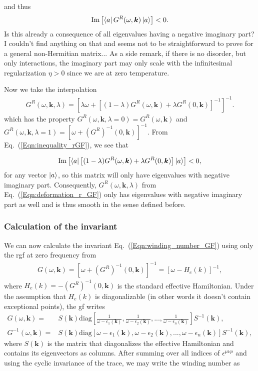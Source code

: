 \documentclass[english]{scrartcl}
\newcommand{\eq}[1]{Eq.~(\ref{#1})}
\begin{document}
and thus 
\begin{align}
\text{Im} \left[\bra{a} G^R(\omega, \bm k)  \ket{a} \right] < 0. \label{Eqn:inequality_rGF}
\end{align}
{\color{red}Is this already a consequence of all eigenvalues having a negative imaginary part? I couldn't find anything on that and seems not to be straightforward to prove for a general non-Hermitian matrix...} As a side remark, if there is no disorder, but only interactions, the imaginary part may only scale with the infinitesimal regularization $\eta >0$ since we are at zero temperature.

Now we take the interpolation 
\begin{align}
G^R(\omega, \bm k,\lambda) = \left [\lambda \omega + \left [(1- \lambda)  G^R(\omega, \bm k) + \lambda G^R(0, \bm k) \right]^{-1} \right]^{-1}.  \label{Eqn:deformation_r_GF}
\end{align}
which has the property $G^R(\omega, \bm k,\lambda = 0) =  G^R(\omega, \bm k)$ and $G^R(\omega, \bm k,\lambda = 1) = [\omega + (G^R)^{-1}(0, \bm k)]^{-1}$. From \eq{Eqn:inequality_rGF}, we see that

\begin{align*}
\text{Im} \left[\bra{a} \left [(1- \lambda)  G^R(\omega, \bm k) + \lambda G^R(0, \bm k) \right] \ket{a} \right] < 0,
\end{align*}
for any vector $\ket{a}$, so this matrix will only have eigenvalues with negative imaginary part. Consequently, $G^R(\omega, \bm k,\lambda)$ from \eq{Eqn:deformation_r_GF} only has eigenvalues with negative imaginary part as well and is thus smooth in the sense defined before.

\subsubsection{Calculation of the invariant}
We can now calculate the invariant \eq{Eqn:winding_number_GF} using only the \gls{rgf} at zero frequency from 
\begin{align*}
G(\omega, \bm k) = [\omega + (G^R)^{-1}(0, \bm k)]^{-1} = [\omega - H_e(k)]^{-1},
\end{align*}
where $H_e(k) = - (G^R)^{-1}(0, \bm k)$ is the standard effective Hamiltonian. 
Under the assumption that $H_e(k)$ is diagonalizable (in other words it doesn't contain exceptional points), the \gls{gf} writes
\begin{align*}
G(\omega, \bm k) =& S(\bm k) \text{diag}\left[ \frac{1}{\omega - \epsilon_1(\bm k)},\frac{1}{\omega - \epsilon_2(\bm k)}, ..., \frac{1}{\omega - \epsilon_n(\bm k)}\right] S^{-1}(\bm k), \\
G^{-1}(\omega, \bm k) =& S(\bm k) \text{diag}\left[\omega - \epsilon_1(\bm k),\omega - \epsilon_2(\bm k), ..., \omega - \epsilon_n(\bm k)\right] S^{-1}(\bm k),
\end{align*}
where $S(\bm k)$ is the matrix that diagonalizes the effective Hamiltonian and contains its eigenvectors as columns. After summing over all indices of $\epsilon^{\mu \nu \rho}$ and using the cyclic invariance of the trace, we may write the winding number as
\end{document}
